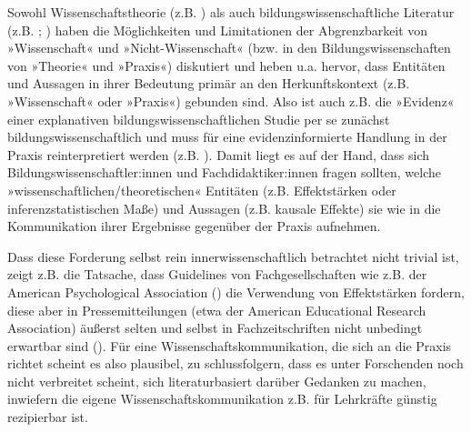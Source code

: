 \documentclass[
  man,
  floatsintext,
  longtable,
  nolmodern,
  notxfonts,
  notimes,
  colorlinks=true,linkcolor=blue,citecolor=blue,urlcolor=blue]{apa7}
\begin{document}
Sowohl Wissenschaftstheorie (z.B. ) als auch bildungswissenschaftliche Literatur (z.B.
;
) haben die Möglichkeiten und
Limitationen der Abgrenzbarkeit von »Wissenschaft« und
»Nicht-Wissenschaft« (bzw. in den Bildungswissenschaften von »Theorie«
und »Praxis«) diskutiert und heben u.a. hervor, dass Entitäten und
Aussagen in ihrer Bedeutung primär an den Herkunftskontext (z.B.
»Wissenschaft« oder »Praxis«) gebunden sind. Also ist auch z.B. die
»Evidenz« einer explanativen bildungswissenschaftlichen Studie per se
zunächst bildungswissenschaftlich und muss für eine evidenzinformierte
Handlung in der Praxis reinterpretiert werden (z.B.
). Damit liegt
es auf der Hand, dass sich Bildungswissenschaftler:innen und
Fachdidaktiker:innen fragen sollten, welche
»wissenschaftlichen/theoretischen« Entitäten (z.B. Effektstärken oder
inferenzstatistischen Maße) und Aussagen (z.B. kausale Effekte) sie wie
in die Kommunikation ihrer Ergebnisse gegenüber der Praxis aufnehmen.

Dass diese Forderung selbst rein innerwissenschaftlich betrachtet nicht
trivial ist, zeigt z.B. die Tatsache, dass Guidelines von
Fachgesellschaften wie z.B. der American Psychological Association
() die
Verwendung von Effektstärken fordern, diese aber in Pressemitteilungen
(etwa der American Educational Research Association) äußerst selten und
selbst in Fachzeitschriften nicht unbedingt erwartbar sind
(). Für eine
Wissenschaftskommunikation, die sich an die Praxis richtet scheint es
also plausibel, zu schlussfolgern, dass es unter Forschenden noch nicht
verbreitet scheint, sich literaturbasiert darüber Gedanken zu machen,
inwiefern die eigene Wissenschaftskommunikation z.B. für Lehrkräfte
günstig rezipierbar ist.
\end{document}

